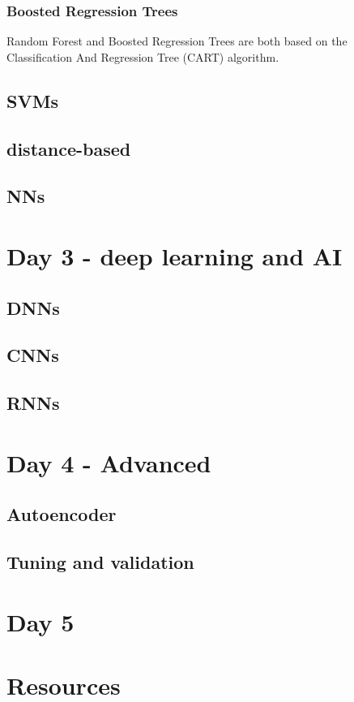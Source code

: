 \documentclass[a4paper,twoside]{tufte-book}\usepackage[]{graphicx}\usepackage[]{color}
\begin{document}
\subsection{Boosted Regression Trees}
\citep[RF,][]{Breiman2001a}

%
Random Forest \citep[RF,][]{Breiman2001a} and Boosted Regression Trees \citep[BRT,][]{Friedman2001} are both based on the Classification And Regression Tree (CART) algorithm.
%

\section{SVMs}

\section{distance-based}


\section{NNs}


\chapter{Day 3 - deep learning and AI}

\section{DNNs}

\section{CNNs}

\section{RNNs}

\chapter{Day 4 - Advanced}

\section{Autoencoder}

\section{Tuning and validation}


\chapter{Day 5}





\chapter{Resources}




\end{document}
